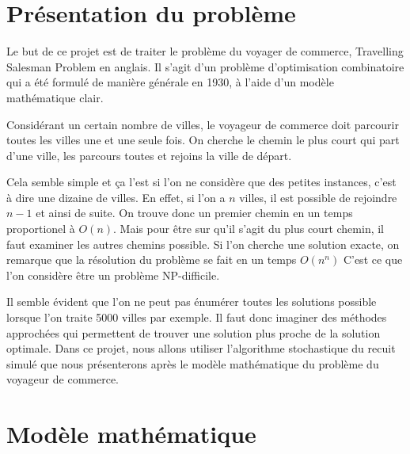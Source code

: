 \documentclass{article}
\begin{document}



\section{Présentation du problème}

Le but de ce projet est de traiter le problème du voyager de commerce, Travelling Salesman Problem en anglais.
Il s'agit d'un problème d'optimisation combinatoire qui a été formulé de manière générale en 1930, à l'aide d'un modèle mathématique clair.

Considérant un certain nombre de villes, le voyageur de commerce doit parcourir toutes les villes une et une seule fois.
On cherche le chemin le plus court qui part d'une ville, les parcours toutes et rejoins la ville de départ.

Cela semble simple et ça l'est si l'on ne considère que des petites instances, c'est à dire une dizaine de villes.
En effet, si l'on a $n$ villes, il est possible de rejoindre $n-1$ et ainsi de suite.
On trouve donc un premier chemin en un temps proportionel à $O(n)$.
Mais pour être sur qu'il s'agit du plus court chemin, il faut examiner les autres chemins possible.
Si l'on cherche une solution exacte, on remarque que la résolution du problème se fait en un temps $O(n^{n})$
C'est ce que l'on considère être un problème NP-difficile.

Il semble évident que l'on ne peut pas énumérer toutes les solutions possible lorsque l'on traite 5000 villes par exemple.
Il faut donc imaginer des méthodes approchées qui permettent de trouver une solution plus proche de la solution optimale.
Dans ce projet, nous allons utiliser l'algorithme stochastique du recuit simulé que nous présenterons après le modèle mathématique du problème du voyageur de commerce.

\section{Modèle mathématique}
\end{document}
